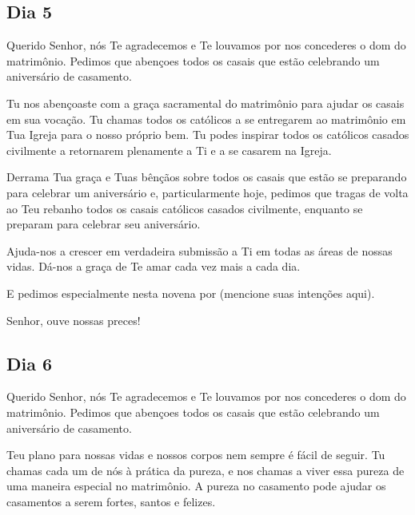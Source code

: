 \documentclass[18pt]{article}
\begin{document}
\begin{center}
 \subsection*{Dia 5}
\end{center}



Querido Senhor, nós Te agradecemos e Te louvamos por nos concederes o dom do matrimônio. Pedimos que abençoes todos os casais que estão celebrando um aniversário de casamento.  

Tu nos abençoaste com a graça sacramental do matrimônio para ajudar os casais em sua vocação. Tu chamas todos os católicos a se entregarem ao matrimônio em Tua Igreja para o nosso próprio bem. Tu podes inspirar todos os católicos casados civilmente a retornarem plenamente a Ti e a se casarem na Igreja.  

Derrama Tua graça e Tuas bênçãos sobre todos os casais que estão se preparando para celebrar um aniversário e, particularmente hoje, pedimos que tragas de volta ao Teu rebanho todos os casais católicos casados civilmente, enquanto se preparam para celebrar seu aniversário.  

Ajuda-nos a crescer em verdadeira submissão a Ti em todas as áreas de nossas vidas. Dá-nos a graça de Te amar cada vez mais a cada dia.  

E pedimos especialmente nesta novena por (mencione suas intenções aqui).  

Senhor, ouve nossas preces!  

\begin{center}
 \textbf{}
\end{center}



\begin{center}
 \subsection*{Dia 6}
\end{center}



Querido Senhor, nós Te agradecemos e Te louvamos por nos concederes o dom do matrimônio. Pedimos que abençoes todos os casais que estão celebrando um aniversário de casamento.  

Teu plano para nossas vidas e nossos corpos nem sempre é fácil de seguir. Tu chamas cada um de nós à prática da pureza, e nos chamas a viver essa pureza de uma maneira especial no matrimônio. A pureza no casamento pode ajudar os casamentos a serem fortes, santos e felizes.  
\end{document}
